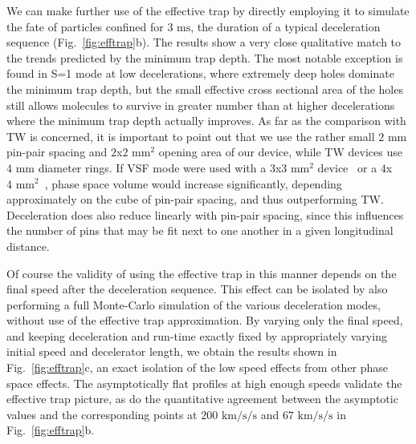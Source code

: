 We can make further use of the effective trap by directly employing it to simulate the fate of particles confined for $3\text{ ms}$, the duration of a typical deceleration sequence (Fig.~\ref{fig:efftrap}b). 
The results show a very close qualitative match to the trends predicted by the minimum trap depth. 
The most notable exception is found in S=1 mode at low decelerations, where extremely deep holes dominate the minimum trap depth, but the small effective cross sectional area of the holes still allows molecules to survive in greater number than at higher decelerations where the minimum trap depth actually improves.
As far as the comparison with TW is concerned, it is important to point out that we use the rather small $2\text{ mm}$ pin-pair spacing and $2$x$2\text{ mm}^2$ opening area of our device, while TW devices use $4\text{ mm}$ diameter rings.
If VSF mode were used with a $3$x$3\text{ mm}^2$ device~\cite{Scharfenberg2009} or a $4$x$4\text{ mm}^2$~\cite{VanDeMeerakker2005}, phase space volume would increase significantly, depending approximately on the cube of pin-pair spacing, and thus outperforming TW. 
Deceleration does also reduce linearly with pin-pair spacing, since this influences the number of pins that may be fit next to one another in a given longitudinal distance.

Of course the validity of using the effective trap in this manner depends on the final speed after the deceleration sequence.
This effect can be isolated by also performing a full Monte-Carlo simulation of the various deceleration modes, without use of the effective trap approximation.
By varying only the final speed, and keeping deceleration and run-time exactly fixed by appropriately varying initial speed and decelerator length, we obtain the results shown in Fig.~\ref{fig:efftrap}c, an exact isolation of the low speed effects from other phase space effects.
The asymptotically flat profiles at high enough speeds validate the effective trap picture, as do the quantitative agreement between the asymptotic values and the corresponding points at $200\text{ km/s/s}$ and $67\text{ km/s/s}$ in Fig.~\ref{fig:efftrap}b. 

